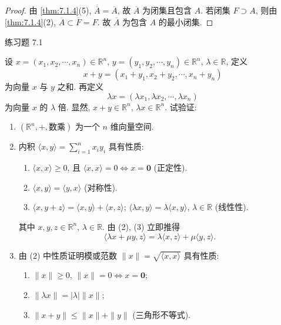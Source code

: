 \begin{proof}
由 \cref{thm:7.1.4}(5), $\overline{\overline{A}} = \overline{A}$, 故 $\overline{A}$ 为闭集且包含 $A$. 若闭集 $F \supset A$, 则由 \cref{thm:7.1.4}(2), $\overline{A} \subset \overline{F} = F$. 故 $\overline{A}$ 为包含 $A$ 的最小闭集. \qedhere
\end{proof}


\begin{exblock}{练习题 7.1}
  \item 设 $x = (x_1, x_2, \cdots, x_n) \in \mathbb{R}^n$, $y = (y_1, y_2, \cdots, y_n) \in \mathbb{R}^n$, $\lambda \in \mathbb{R}$, 定义
  \[
    x + y = (x_1 + y_1, x_2 + y_2, \cdots, x_n + y_n)
  \]
  为向量 $x$ 与 $y$ 之和. 再定义
  \[
    \lambda x = (\lambda x_1, \lambda x_2, \cdots, \lambda x_n)
  \]
  为向量 $x$ 的 $\lambda$ 倍. 显然, $x + y \in \mathbb{R}^n$, $\lambda x \in \mathbb{R}^n$. 试验证:
  \begin{enumerate}
    \item $(\mathbb{R}^n, +, \text{数乘})$ 为一个 $n$ 维向量空间.
    \item 内积 $\langle x, y \rangle = \sum\limits_{i=1}^{n} x_i y_i$ 具有性质:
    \begin{enumerate}
      \item $\langle x, x \rangle \geqslant 0$, 且 $\langle x, x \rangle = 0 \iff x = \boldsymbol{0}$ (正定性).
      \item $\langle x, y \rangle = \langle y, x \rangle$ (对称性).
      \item $\langle x, y + z \rangle = \langle x, y \rangle + \langle x, z \rangle$; $\langle \lambda x, y \rangle = \lambda \langle x, y \rangle$, $\lambda \in \mathbb{R}$ (线性性).
    \end{enumerate}
    其中 $x, y, z \in \mathbb{R}^n$, $\lambda \in \mathbb{R}$. 由 (2), (3) 立即推得
    \[
      \langle \lambda x + \mu y, z \rangle = \lambda \langle x, z \rangle + \mu \langle y, z \rangle.
    \]
    \item 由 (2) 中性质证明模或范数 $\|x\| = \sqrt{\langle x, x \rangle}$ 具有性质:
    \begin{enumerate}
      \item $\|x\| \geqslant 0$, $\|x\| = 0 \iff x = \boldsymbol{0}$;
      \item $\|\lambda x\| = |\lambda| \|x\|$;
      \item $\|x + y\| \leqslant \|x\| + \|y\|$ (三角形不等式).

\end{enumerate}
\end{enumerate}
\end{exblock}
